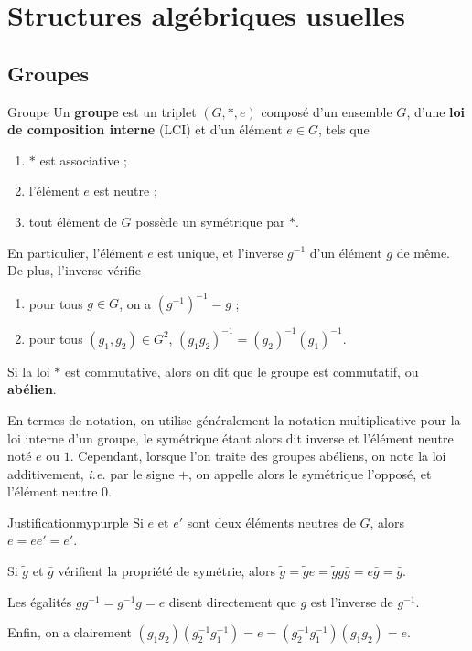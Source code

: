 
\section{Structures algébriques usuelles}

\subsection{Groupes}

    \begin{defitheo}{Groupe}{}
        Un \textbf{groupe} est un triplet $(G,*,e)$ composé d’un ensemble $G$, d’une \textbf{loi de composition interne} (LCI) et d’un élément $e \in G$, tels que 
        \begin{enumerate}[label=$(h_{\alph*})$]
            \item $*$ est associative ;
            \item l’élément $e$ est neutre ;
            \item tout élément de $G$ possède un symétrique par $*$.
        \end{enumerate}
        En particulier, l’élément $e$ est unique, et l’inverse $g^{-1}$ d’un élément $g$ de même. De plus, l’inverse vérifie
        \begin{enumerate}[label = \arabic*.]
            \item pour tous $g \in G$, on a $(g^{-1})^{-1} = g$ ;
            \item pour tous $(g_1,g_2) \in G^2$, $(g_1 g_2)^{-1} = (g_2)^{-1} (g_1)^{-1}$.
        \end{enumerate}
        Si la loi $*$ est commutative, alors on dit que le groupe est commutatif, ou \textbf{abélien}.
    \end{defitheo}

    En termes de notation, on utilise généralement la notation multiplicative pour la loi interne d’un groupe, le symétrique étant alors dit inverse et l’élément neutre noté $e$ ou $1$. Cependant, lorsque l’on traite des groupes abéliens, on note la loi additivement, \textit{i.e.} par le signe $+$, on appelle alors le symétrique l’opposé, et l’élément neutre $0$.

    \begin{demo}{Justification}{mypurple}
        Si $e$ et $e'$ sont deux éléments neutres de $G$, alors $e = e e' = e'$.

        Si $\tilde{g}$ et $\bar{g}$ vérifient la propriété de symétrie, alors $\tilde{g} = \tilde{g} e = \tilde{g} g \bar{g} = e \bar{g} = \bar{g}$.

        Les égalités $gg^{-1} = g^{-1}g=e$ disent directement que $g$ est l’inverse de $g^{-1}$.

        Enfin, on a clairement $(g_1 g_2)(g_2^{-1} g_1^{-1}) = e = (g_2^{-1} g_1^{-1})(g_1 g_2) = e$.
    \end{demo}

